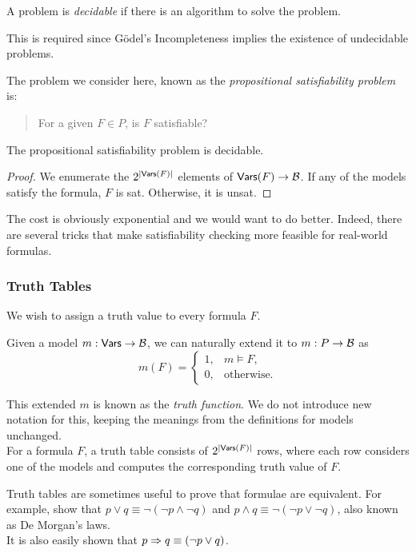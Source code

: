 \begin{fdef}
A problem is \textit{decidable} if there is an algorithm to solve the problem.
\end{fdef}

This is required since G\"odel's Incompleteness implies the existence of undecidable problems.

The problem we consider here, known as the \textit{propositional satisfiability problem} is:
\begin{quote}
For a given $F\in P$, is $F$ satisfiable?
\end{quote}

\begin{theorem}
The propositional satisfiability problem is decidable.
\end{theorem}
\begin{proof}
We enumerate the $2^{|\mathsf{Vars}(F)|}$ elements of $\mathsf{Vars}(F)\to\mathcal{B}$. If any of the models satisfy the formula, $F$ is sat. Otherwise, it is unsat.
\end{proof}

The cost is obviously exponential and we would want to do better. Indeed, there are several tricks that make satisfiability checking more feasible for real-world formulas.

\subsubsection{Truth Tables}

We wish to assign a truth value to every formula $F$.

Given a model $m:\mathsf{Vars}\to\mathcal{B}$, we can naturally extend it to $m:P\to \mathcal{B}$ as
\[
    m(F) = 
    \begin{cases}
    1, & m\vDash F, \\
    0, & \text{otherwise.}
    \end{cases}
\]

This extended $m$ is known as the \textit{truth function}. We do not introduce new notation for this, keeping the meanings from the definitions for models unchanged.\\

For a formula $F$, a truth table consists of $2^{|\mathsf{Vars}(F)|}$ rows, where each row considers one of the models and computes the corresponding truth value of $F$.

Truth tables are sometimes useful to prove that formulae are equivalent. For example, show that $p\vee q \equiv \neg(\neg p \wedge \neg q)$ and $p\wedge q \equiv \neg(\neg p \vee \neg q)$, also known as De Morgan's laws.\\
It is also easily shown that $p\Rightarrow q \equiv (\neg p \vee q)$.

